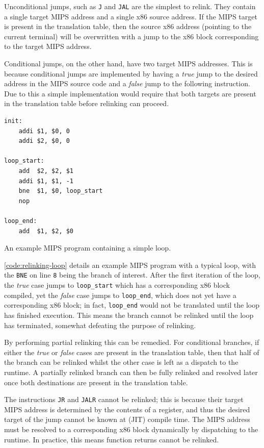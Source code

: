 Unconditional jumps, such as \texttt{J} and \texttt{JAL} are the simplest to relink. They contain a single target MIPS address and a single x86 source address. If the MIPS target is present in the translation table, then the source x86 address (pointing to the current terminal) will be overwritten with a jump to the x86 block corresponding to the target MIPS address.

Conditional jumps, on the other hand, have two target MIPS addresses. This is because conditional jumps are implemented by having a \textit{true} jump to the desired address in the MIPS source code and a \textit{false} jump to the following instruction. Due to this a simple implementation would require that both targets are present in the translation table before relinking can proceed.

\begin{lstfloat}[h]
    \begin{lstlisting}
init:
    addi $1, $0, 0
    addi $2, $0, 0

loop_start:
    add  $2, $2, $1
    addi $1, $1, -1
    bne  $1, $0, loop_start
    nop

loop_end:
    add  $1, $2, $0

    \end{lstlisting}
    \caption{An example MIPS program containing a simple loop.}
    \label{code:relinking-loop}
\end{lstfloat}

\autoref{code:relinking-loop} details an example MIPS program with a typical loop, with the \texttt{BNE} on line \texttt{8} being the branch of interest. After the first iteration of the loop, the \textit{true} case jumps to \texttt{loop\_start} which has a corresponding x86 block compiled, yet the \textit{false} case jumps to \texttt{loop\_end}, which does not yet have a corresponding x86 block; in fact, \texttt{loop\_end} would not be translated until the loop has finished execution. This means the branch cannot be relinked until the loop has terminated, somewhat defeating the purpose of relinking.

By performing partial relinking this can be remedied. For conditional branches, if either the \textit{true} or \textit{false} cases are present in the translation table, then that half of the branch can be relinked whilst the other case is left as a dispatch to the runtime. A partially relinked branch can then be fully relinked and resolved later once both destinations are present in the translation table.

The instructions \texttt{JR} and \texttt{JALR} cannot be relinked; this is because their target MIPS address is determined by the contents of a register, and thus the desired target of the jump cannot be known at (JIT) compile time. The MIPS address must be resolved to a corresponding x86 block dynamically by dispatching to the runtime. In practice, this means function returns cannot be relinked.